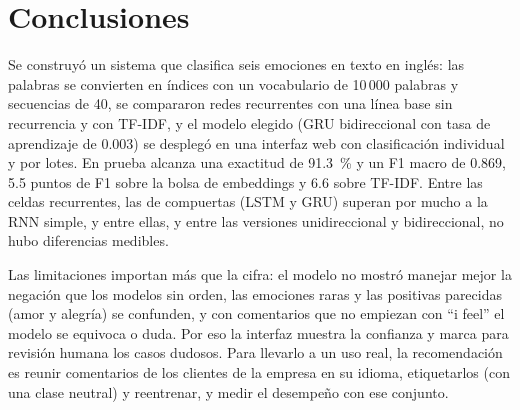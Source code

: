 \documentclass[11pt,letterpaper]{article}
\begin{document}
\section{Conclusiones}

Se construyó un sistema que clasifica seis emociones en texto en inglés: las palabras se convierten en índices con un vocabulario de 10\,000 palabras y secuencias de 40, se compararon redes recurrentes con una línea base sin recurrencia y con TF-IDF, y el modelo elegido (GRU bidireccional con tasa de aprendizaje de 0.003) se desplegó en una interfaz web con clasificación individual y por lotes. En prueba alcanza una exactitud de 91.3~\% y un F1 macro de 0.869, 5.5 puntos de F1 sobre la bolsa de embeddings y 6.6 sobre TF-IDF. Entre las celdas recurrentes, las de compuertas (LSTM y GRU) superan por mucho a la RNN simple, y entre ellas, y entre las versiones unidireccional y bidireccional, no hubo diferencias medibles.

Las limitaciones importan más que la cifra: el modelo no mostró manejar mejor la negación que los modelos sin orden, las emociones raras y las positivas parecidas (amor y alegría) se confunden, y con comentarios que no empiezan con ``i feel'' el modelo se equivoca o duda. Por eso la interfaz muestra la confianza y marca para revisión humana los casos dudosos. Para llevarlo a un uso real, la recomendación es reunir comentarios de los clientes de la empresa en su idioma, etiquetarlos (con una clase neutral) y reentrenar, y medir el desempeño con ese conjunto.

\end{document}
